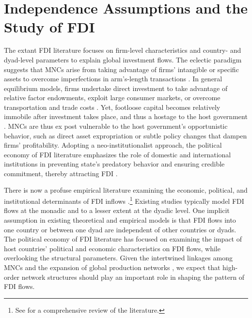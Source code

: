 \documentclass[reqno,onecolumn,letterpaper,12pt]{article}
\begin{document}



\section{Independence Assumptions and the Study of FDI}

The extant FDI literature focuses on firm-level characteristics and country- and dyad-level parameters to explain global investment flows. The eclectic paradigm suggests that MNCs arise from taking advantage of firms' intangible or specific assets to overcome imperfections in arm's-length transactions \citep{Dunning:1988,Dunning:1992}. In general equilibrium models, firms undertake direct investment to take advantage of relative factor endowments, exploit large consumer markets, or overcome transportation and trade costs \citep[e.g.,][]{Helpman:1984,Carr_et_al:2001}. %
Yet, footloose capital becomes relatively immobile after investment takes place, and thus a hostage to the host government \citep{Vernon:1971,Vernon:1980}. MNCs are thus ex post vulnerable to the host government's opportunistic behavior, such as direct asset expropriation or subtle policy changes that dampen firms' profitability. Adopting a neo-institutionalist approach, the political economy of FDI literature emphasizes the role of domestic and international institutions in preventing state's predatory behavior and ensuring credible commitment, thereby attracting FDI \citep[e.g.,][]{Henisz:2000,Jensen:2003,Jensen:2006,Li_Resnick:2003,Staats_Biglaiser:2012,Buthe_Milner:2008,Allee_Peinhardt:2011,Kerner:2009}.

There is now a profuse empirical literature examining the economic, political, and institutional determinants of FDI inflows \citep[e.g.,][]{Noorbakhsh_et_al:2001,Yeaple:2003,Jensen:2003,Li_Resnick:2003,Buthe_Milner:2008,Li_Vashchilko:2010,Kerner:2009,Wright_Zhu:2017,Pinto_Pinto:2008,Pinto:2013}.\footnote{See \citet{Pandya:2016} for a comprehensive review of the literature.} Existing studies typically model FDI flows at the monadic and to a lesser extent at the dyadic level. One implicit assumption in existing theoretical and empirical models is that FDI flows into one country or between one dyad are independent of other countries or dyads. The political economy of FDI literature has focused on examining the impact of host countries' political and economic characteristics on FDI flows, while overlooking the structural parameters. Given the intertwined linkages among MNCs and the expansion of global production networks \citep{UNCTAD:2013}, we expect that high-order network structures should play an important role in shaping the pattern of FDI flows.
\end{document}
